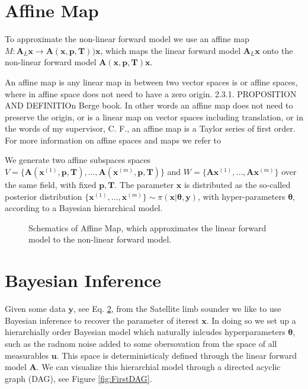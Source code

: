 \section{Affine Map}

To approximate the non-linear forward model we use an affine map $ M:\bm{A}_L \bm{x} \rightarrow \bm{A}(\bm{x},  \bm{p},\bm{T})) \bm{x}$, which maps the linear forward model $\bm{A}_L \bm{x}$ onto the non-linear forward model $\bm{A}(\bm{x},  \bm{p},\bm{T}) \bm{x}$.


An affine map is any linear map in between two vector spaces is or affine spaces, where in affine space does not need to have a zero origin. 2.3.1. PROPOSITION AND DEFINITIOn Berge book\cite{}.
In other words an affine map does not need to preserve the origin, or is a linear map on vector spaces including translation, or in the words of my supervisor, C. F., an affine map is a Taylor series of first order.
For more information on affine spaces and maps we refer to \cite{two books}

We generate two affine subspaces spaces \newline $V = \big\{ \bm{A}(\bm{x}^{(1)}, \bm{p,T}), \dots ,\bm{A}(\bm{x}^{(m)}, \bm{p,T})\big\} $ and $W = \big\{ \bm{A}\bm{x}^{(1)}, \dots ,\bm{A}\bm{x}^{(m)}\big\}$ over the same field, with fixed $\bm{p,T}$.
The parameter $\bm{x}$ is distributed as the so-called posterior distribution $\big\{  \bm{x}^{(1)} , \dots, \bm{x}^{(m)} \big\} \sim \pi(\bm{x}|\bm{\theta},\bm{y})$, with hyper-parameters $\bm{\theta}$, according to a Bayesian hierarchical model.



\begin{figure}[ht!]
	\centering
	\caption[Schematics of Affine Map]{Schematics of Affine Map, which approximates the linear forward model to the non-linear forward model.}
\end{figure}

\section{Bayesian Inference}
Given some data $\bm{y}$, see Eq. \ref{}, from the Satellite limb sounder we like to use Bayesian inference to recover the parameter of iterest $\bm{x}$.
In doing so we set up a hierarchially order Bayesian model which naturally inlcudes hyperparameters $\bm{\theta}$, such as the radnom noise added to some obersovation from the space of all measurables $\bm{u}$.
This space is deterministicaly defined through the linear forward model $\bm{A}$.
We can visualize this hierarchial model through a directed acyclic graph (DAG), see Figure \ref{fig:FirstDAG}.

